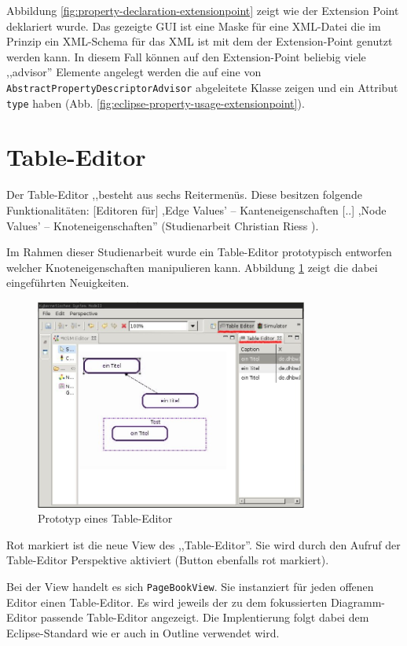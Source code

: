 \documentclass[%
12pt,titlepage,abstracton,DIV=10]{scrreprt}
\begin{document}
Abbildung \ref{fig:property-declaration-extensionpoint} zeigt wie der Extension
Point deklariert wurde. Das gezeigte GUI ist eine Maske für eine XML-Datei die
im Prinzip ein XML-Schema für das XML ist mit dem der Extension-Point
genutzt werden kann. In diesem Fall können auf den Extension-Point beliebig
viele ,,advisor'' Elemente angelegt werden die auf eine von
\texttt{Abstract\-Property\-Descriptor\-Advisor} abgeleitete Klasse zeigen und
ein Attribut \texttt{type} haben (Abb.
\ref{fig:eclipse-property-usage-extensionpoint}).


\section{Table-Editor}
Der Table-Editor ,,besteht aus sechs Reitermenüs. Diese besitzen folgende
Funktionalitäten: [Editoren für] ,Edge Values' – Kanteneigenschaften [..]
,Node Values' – Knoteneigenschaften'' (Studienarbeit Christian Riess \cite[S.
24]{riess03}).

Im Rahmen dieser Studienarbeit wurde ein Table-Editor prototypisch entworfen
welcher Knoteneigenschaften manipulieren kann. Abbildung \ref{fig:table-editor}
zeigt die dabei eingeführten Neuigkeiten.

\begin{figure}[ht]
\centering
\includegraphics[width=0.8\textwidth]{images/table-editor.jpg}
\caption{Prototyp eines Table-Editor}
\label{fig:table-editor}
\end{figure}

Rot markiert ist die neue View des ,,Table-Editor''. Sie wird durch den Aufruf
der Table-Editor Perspektive aktiviert (Button ebenfalls rot markiert).

Bei der View handelt es sich \texttt{PageBookView}. Sie instanziert für jeden
offenen Editor einen Table-Editor. Es wird jeweils der zu dem fokussierten
Diagramm-Editor passende Table-Editor angezeigt. Die Implentierung folgt dabei
dem Eclipse-Standard wie er auch in Outline verwendet wird.
\end{document}
